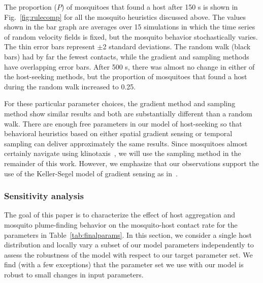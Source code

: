 \documentclass[10pt]{article}
\begin{document}
The proportion ($P$) of mosquitoes that found a host after 150 s is shown in Fig.~\ref{fig:rulecomp} for all the mosquito heuristics discussed above. The values shown in the bar graph are averages over 15 simulations in which the time series of random velocity fields is fixed, but the mosquito behavior stochastically varies. The thin error bars represent $\pm$2 standard deviations. The random walk (black bars) had by far the fewest contacts, while the gradient and sampling methods have overlapping error bars. After 500 s, there was almost no change in either of the host-seeking methods, but the proportion of mosquitoes that found a host during the random walk increased to 0.25. 

For these particular parameter choices, the gradient method and sampling method show similar results and both are substantially different than a random walk. There are enough free parameters in our model of host-seeking so that behavioral heuristics based on either spatial gradient sensing or temporal sampling can deliver approximately the same results. Since mosquitoes almost certainly navigate using klinotaxis~\cite{Carde1996}, we will use the sampling method in the remainder of this work. However, we emphasize that our observations support the use of the Keller-Segel model of gradient sensing as in~\cite{KellerSegel,Hortsmann}.


\subsubsection*{Sensitivity analysis}\label{sec:SA}
The goal of this paper is to characterize the effect of host aggregation and mosquito plume-finding behavior on the mosquito-host contact rate for the parameters in Table~\ref{tab:finalparams}. In this section, we consider a single host distribution and locally vary a subset of our model parameters independently to assess the robustness of the model with respect to our target parameter set. We find (with a few exceptions) that the parameter set we use with our model is robust to small changes in input parameters. 
\end{document}
